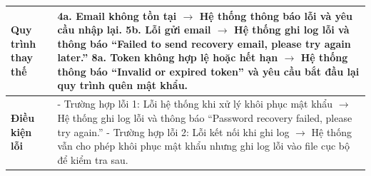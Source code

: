 \begin{longtable}{|p{}|p{}|}
\textbf{Quy trình thay thế} &
4a. Email không tồn tại $\rightarrow$ Hệ thống thông báo lỗi và yêu cầu nhập lại. \newline
5b. Lỗi gửi email $\rightarrow$ Hệ thống ghi log lỗi và thông báo “Failed to send recovery email, please try again later.” \newline
8a. Token không hợp lệ hoặc hết hạn $\rightarrow$ Hệ thống thông báo “Invalid or expired token” và yêu cầu bắt đầu lại quy trình quên mật khẩu. \\ \hline
\textbf{Điều kiện lỗi} &
- Trường hợp lỗi 1: Lỗi hệ thống khi xử lý khôi phục mật khẩu $\rightarrow$ Hệ thống ghi log lỗi và thông báo “Password recovery failed, please try again.” \newline
- Trường hợp lỗi 2: Lỗi kết nối khi ghi log $\rightarrow$ Hệ thống vẫn cho phép khôi phục mật khẩu nhưng ghi log lỗi vào file cục bộ để kiểm tra sau. \\ \hline
\end{longtable}

